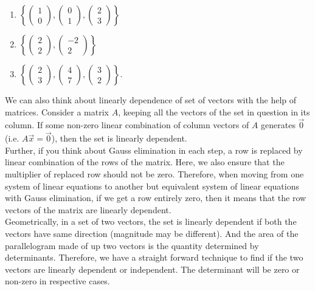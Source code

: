 \documentclass{article}
\begin{document}
\begin{enumerate}
    \item \(\left\{ \begin{pmatrix} 1 \\ 0 \end{pmatrix}, \begin{pmatrix} 0 \\ 1 \end{pmatrix}, \begin{pmatrix} 2 \\ 3 \end{pmatrix}\right\}\)
    \item \(\left\{\begin{pmatrix} 2 \\ 2 \end{pmatrix}, \begin{pmatrix} -2 \\ 2 \end{pmatrix}\right\}\)
    \item \(\left\{ \begin{pmatrix} 2 \\ 3 \end{pmatrix}, \begin{pmatrix} 4 \\ 7 \end{pmatrix}, \begin{pmatrix} 3 \\ 2 \end{pmatrix} \right\}\).
\end{enumerate}

We can also think about linearly dependence of set of vectors with the help of matrices. Consider a matrix $A$, keeping all the vectors of the set in question in its column. If some non-zero linear combination of column vectors of $A$ generates $\vec{0}$ (i.e. $A\vec{x}=\vec{0}$), then the set is linearly dependent. \\

Further, if you think about Gauss elimination in each step, a row is replaced by linear combination of the rows of the matrix. Here, we also ensure that the multiplier of replaced row should not be zero. Therefore, when moving from one system of linear equations to another but equivalent system of linear equations with Gauss elimination, if we get a row entirely zero, then it means that the row vectors of the matrix are linearly dependent.\\

Geometrically, in a set of two vectors, the set is linearly dependent if both the vectors have same direction (magnitude may be different). And the area of the parallelogram made of up two vectors is the quantity determined by determinants. Therefore, we have a straight forward technique to find if the two vectors are linearly dependent or independent. The determinant will be zero or non-zero in respective cases.
\end{document}
